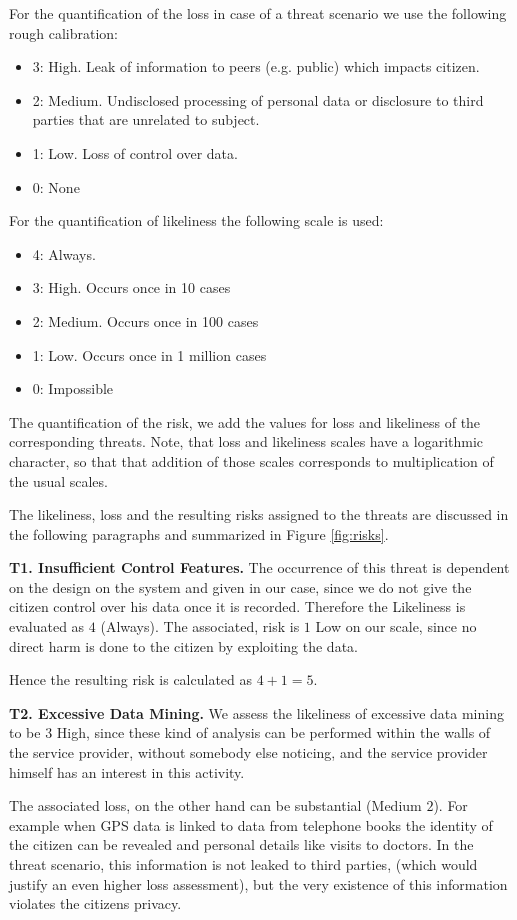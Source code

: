 For the quantification of the loss in case of a threat scenario we use the following rough calibration:
\begin{itemize}
\item 3: High. Leak of information to peers (e.g. public) which impacts citizen.
\item 2: Medium. Undisclosed processing of personal data or disclosure to third parties that are unrelated to subject.
\item 1: Low. Loss of control over data.
\item 0: None
\end{itemize}

For the quantification of likeliness the following scale is used:
\begin{itemize}
\item 4: Always.
\item 3: High. Occurs once in 10 cases
\item 2: Medium. Occurs once in 100 cases
\item 1: Low. Occurs once in 1 million cases
\item 0: Impossible
\end{itemize}

The quantification of the risk, we add the values for loss and
likeliness of the corresponding threats. Note, that loss and
likeliness scales have a logarithmic character, so that that addition
of those scales corresponds to multiplication of the usual scales.


The likeliness, loss and the resulting risks assigned to the threats
are discussed in the following paragraphs and summarized in Figure
\ref{fig:risks}.


\textbf{T1. Insufficient Control Features.}  The occurrence of this
threat is dependent on the design on the system and given in our case,
since we do not give the citizen control over his data once it is
recorded. Therefore the Likeliness is evaluated as $4$ (Always).  The
associated, risk is $1$ Low on our scale, since no direct harm is done to
the citizen by exploiting the data.

Hence the resulting risk is calculated as $4+1 = 5$.

\textbf{T2. Excessive Data Mining.}
We assess the likeliness of excessive data mining to be $3$ High, since
these kind of analysis can be performed within the walls of the service
provider, without somebody else noticing, and the service provider himself
has an interest in this activity.

The associated loss, on the other hand can be substantial (Medium
$2$).  For example when GPS data is linked to data from telephone
books the identity of the citizen can be revealed and personal details
like visits to doctors. In the threat scenario, this information is
not leaked to third parties, (which would justify an even higher loss
assessment), but the very existence of this information violates the
citizens privacy.


